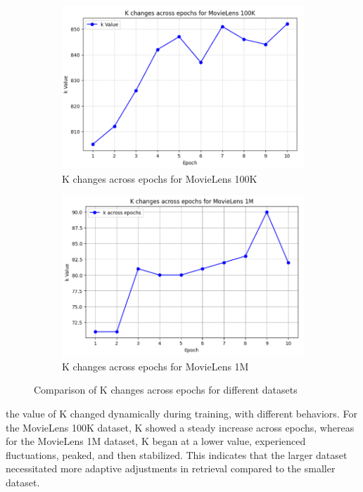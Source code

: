 \begin{figure}[htbp]
	\centering
	\begin{subfigure}{0.48\textwidth}
		\centering
		\includegraphics[width=\linewidth]{Figures/CHAGES_OF_K_FOR_100k.png}
		\caption{K changes across epochs for MovieLens 100K}
		\label{fig:k_changes_100K}
	\end{subfigure}
	\hfill
	\begin{subfigure}{0.48\textwidth}
		\centering
		\includegraphics[width=\linewidth]{Figures/chnages_inK_for_1M.png}
		\caption{K changes across epochs for MovieLens 1M}
		\label{fig:k_changes_1M}
	\end{subfigure}
	\caption{Comparison of K changes across epochs for different datasets}
	\label{fig:k_changes}
\end{figure}
the value of K changed dynamically during training, with different behaviors. For the MovieLens 100K dataset, K showed a steady increase across epochs, whereas for the MovieLens 1M dataset, K began at a lower value, experienced fluctuations, peaked, and then stabilized. This indicates that the larger dataset necessitated more adaptive adjustments in retrieval compared to the smaller dataset.\\
